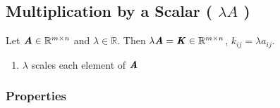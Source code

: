 \subsection{Multiplication by a Scalar ( $\lambda A$ )}

Let $\text{\textbf{\textit{A}}} \in \mathbb{R}^{m\times n}$ and $\lambda \in \mathbb{R}$. 
Then $\lambda \text{\textbf{\textit{A}}} = \text{\textbf{\textit{K}}} \in \mathbb{R}^{m\times n}$, $k_{ij} = \lambda a_{ij}$.
\hfill \cite{mfml/book/mml/Deisenroth-Faisal-Ong}


\begin{enumerate}
    \item $\lambda$ scales each element of $\text{\textbf{\textit{A}}}$
    \hfill \cite{mfml/book/mml/Deisenroth-Faisal-Ong}    
\end{enumerate}





\subsubsection{Properties}

